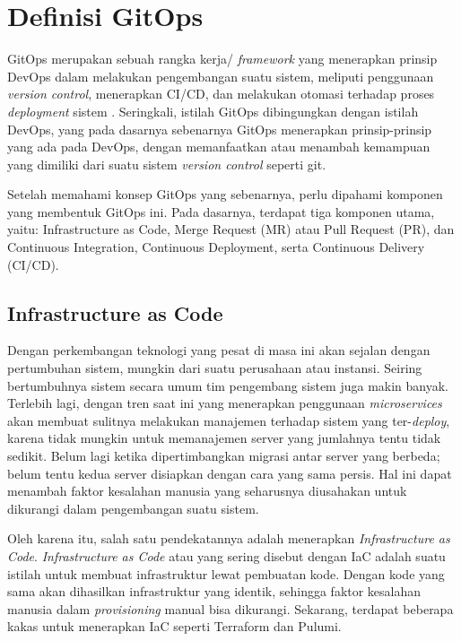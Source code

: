 \section{Definisi GitOps}

GitOps merupakan sebuah rangka kerja/ \textit{framework} yang menerapkan prinsip DevOps dalam melakukan pengembangan suatu sistem, meliputi penggunaan \textit{version control}, menerapkan CI/CD, dan melakukan otomasi terhadap proses \textit{deployment} sistem \cite{gitlab}. Seringkali, istilah GitOps dibingungkan dengan istilah DevOps, yang pada dasarnya sebenarnya GitOps menerapkan prinsip-prinsip yang ada pada DevOps, dengan memanfaatkan atau menambah kemampuan yang dimiliki dari suatu sistem \textit{version control} seperti git.

Setelah memahami konsep GitOps yang sebenarnya, perlu dipahami komponen yang membentuk GitOps ini. Pada dasarnya, terdapat tiga komponen utama, yaitu: Infrastructure as Code, Merge Request (MR) atau Pull Request (PR), dan Continuous Integration, Continuous Deployment, serta Continuous Delivery (CI/CD).

\subsection{Infrastructure as Code}

Dengan perkembangan teknologi yang pesat di masa ini akan sejalan dengan pertumbuhan sistem, mungkin dari suatu perusahaan atau instansi. Seiring bertumbuhnya sistem secara umum tim pengembang sistem juga makin banyak. Terlebih lagi, dengan tren saat ini yang menerapkan penggunaan \textit{microservices} akan membuat sulitnya melakukan manajemen terhadap sistem yang ter-\textit{deploy}, karena tidak mungkin untuk memanajemen server yang jumlahnya tentu tidak sedikit. Belum lagi ketika dipertimbangkan migrasi antar server yang berbeda; belum tentu kedua server disiapkan dengan cara yang sama persis. Hal ini dapat menambah faktor kesalahan manusia yang seharusnya diusahakan untuk dikurangi dalam pengembangan suatu sistem.

Oleh karena itu, salah satu pendekatannya adalah menerapkan \textit{Infrastructure as Code}. \textit{Infrastructure as Code} atau yang sering disebut dengan IaC adalah suatu istilah untuk membuat infrastruktur lewat pembuatan kode. Dengan kode yang sama akan dihasilkan infrastruktur yang identik, sehingga faktor kesalahan manusia dalam \textit{provisioning} manual bisa dikurangi. Sekarang, terdapat beberapa kakas untuk menerapkan IaC seperti Terraform dan Pulumi. 

